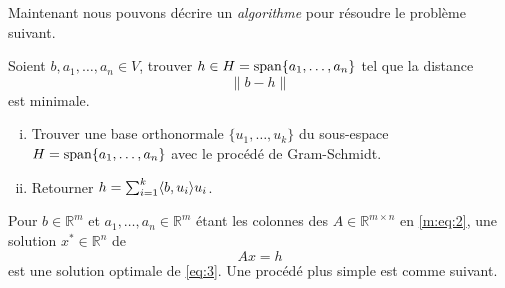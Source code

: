 


\noindent 
Maintenant nous pouvons décrire un \emph{algorithme} pour résoudre le problème suivant. 
\begin{framed}
  \noindent 
  Soient $b,a_1,\dots,a_n \in V$, trouver $h \in H = \operatorname{span} \{a_1,\dots,a_n\}$ tel que la distance 
  \begin{displaymath}
    \|b - h\|
  \end{displaymath}
  est minimale. 
\end{framed}

\begin{algorithm}
  \label{alg:2}  
\begin{enumerate}[i)]
\item Trouver une base orthonormale $\{u_1,\dots,u_k\}$ du sous-espace $H = \operatorname{span}\{a_1,\dots,a_n\}$ 
  avec le procédé de Gram-Schmidt. 
\item Retourner $ h = \sum_{i=1}^k \langle {b,u_i} \rangle u_i$. 
\end{enumerate}
\end{algorithm}
\noindent 
Pour $b ∈ℝ^m$ et $a_1,\dots,a_n ∈ ℝ^m$ étant les colonnes des $A ∈ ℝ^{m ×n}$ en \eqref{m:eq:2},  une solution
$x^* ∈ℝ^n$ de
\begin{equation}
  \label{eq:53}
  Ax = h
\end{equation}
est une solution optimale de \eqref{eq:3}. Une procédé plus simple est comme suivant. 


